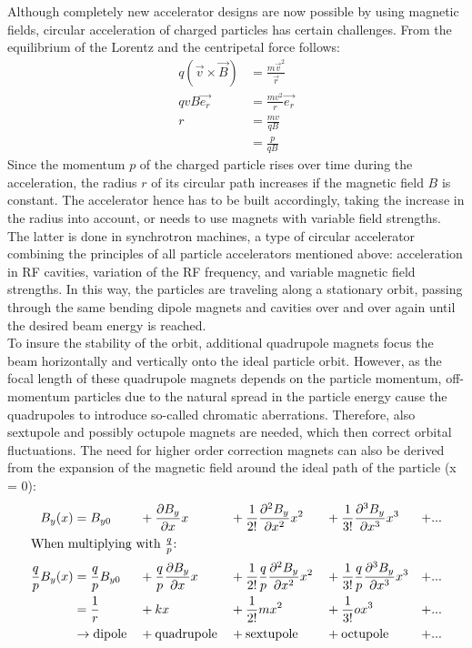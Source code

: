 Although completely new accelerator designs are now possible by using magnetic fields, circular acceleration of charged particles has certain challenges.
From the equilibrium of the Lorentz and the centripetal force follows:
\begin{align}
q(\vec{v}\times \vec{B}) &= \frac{m\vec{v}^2}{\vec{r}}\\
qvB\vec{e_r} &= \frac{mv^2}{r}\vec{e_r} \nonumber \\
 r&=\frac{mv}{qB}\\
 &=\frac{p}{qB}\label{eq:MagField_Radius}
\end{align}
Since the momentum $p$ of the charged particle rises over time during the acceleration, the radius $r$ of its circular path increases if the magnetic field $B$ is constant.
The accelerator hence has to be built accordingly, taking the increase in the radius into account, or needs to use magnets with variable field strengths.
The latter is done in synchrotron machines, a type of circular accelerator combining the principles of all particle accelerators mentioned above: acceleration in RF cavities, variation of the RF frequency, and variable magnetic field strengths.
In this way, the particles are traveling along a stationary orbit, passing through the same bending dipole magnets and cavities over and over again until the desired beam energy is reached.\\
To insure the stability of the orbit, additional quadrupole magnets focus the beam horizontally and vertically onto the ideal particle orbit.
However, as the focal length of these quadrupole magnets depends on the particle momentum, off-momentum particles due to the natural spread in the particle energy cause the quadrupoles to introduce so-called chromatic aberrations.
Therefore, also sextupole and possibly octupole magnets are needed, which then correct orbital fluctuations.
The need for higher order correction magnets can also be derived from the expansion of the magnetic field around the ideal path of the particle (x = 0):
\begin{alignat}{5}
 B_y(x) &= B_{y0} &&+ \frac{\partial B_y}{\partial x}x &&+ \frac{1}{2!}\frac{\partial^2 B_y}{\partial x^2}x^2 &&+ \frac{1}{3!}\frac{\partial^3 B_y}{\partial x^3}x^3 &+ ...\\
 \intertext{When multiplying with $\frac{q}{p}$:}
 \frac{q}{p}B_y(x) &= \frac{q}{p}B_{y0} &&+ \frac{q}{p}\frac{\partial B_y}{\partial x}x &&+  \frac{1}{2!}\frac{q}{p}\frac{\partial^2 B_y}{\partial x^2}x^2 &&+ \frac{1}{3!}\frac{q}{p}\frac{\partial^3 B_y}{\partial x^3}x^3 &+ ...\\
  &= \frac{1}{r} &&+ kx &&+ \frac{1}{2!}mx^2 &&+ \frac{1}{3!}ox^3 &+ ... \label{eq:field_components}\\
  &\rightarrow \textnormal{dipole} &&+ \textnormal{quadrupole} &&+ \textnormal{sextupole} &&+ \textnormal{octupole} &+ ...\nonumber
\end{alignat}
